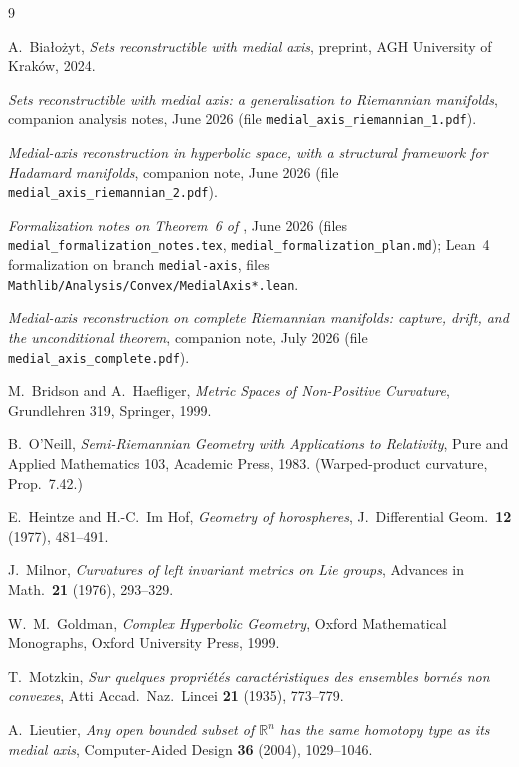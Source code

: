 \documentclass[11pt]{article}
\theoremstyle{remark}
\begin{document}
\begin{thebibliography}{9}

 A.~Bia\l{}o\.zyt, \emph{Sets reconstructible with medial
axis}, preprint, AGH University of Krak\'ow, 2024.

 \emph{Sets reconstructible with medial axis: a
generalisation to Riemannian manifolds}, companion analysis notes,
June 2026 (file \texttt{medial\_axis\_riemannian\_1.pdf}).

 \emph{Medial-axis reconstruction in hyperbolic space,
with a structural framework for Hadamard manifolds}, companion note,
June 2026 (file \texttt{medial\_axis\_riemannian\_2.pdf}).

 \emph{Formalization notes on Theorem~6 of
\cite{Bia}}, June 2026 (files
\texttt{medial\_formalization\_notes.tex},
\texttt{medial\_formalization\_plan.md}); Lean~4 formalization on
branch \texttt{medial-axis}, files
\texttt{Mathlib/Analysis/Convex/MedialAxis*.lean}.

 \emph{Medial-axis reconstruction on complete Riemannian
manifolds: capture, drift, and the unconditional theorem}, companion
note, July 2026 (file \texttt{medial\_axis\_complete.pdf}).

 M.~Bridson and A.~Haefliger, \emph{Metric Spaces of
Non-Positive Curvature}, Grundlehren 319, Springer, 1999.

 B.~O'Neill, \emph{Semi-Riemannian Geometry with
Applications to Relativity}, Pure and Applied Mathematics 103,
Academic Press, 1983. (Warped-product curvature, Prop.~7.42.)

 E.~Heintze and H.-C.~Im Hof, \emph{Geometry of
horospheres}, J.\ Differential Geom.\ \textbf{12} (1977), 481--491.

 J.~Milnor, \emph{Curvatures of left invariant metrics on
Lie groups}, Advances in Math.\ \textbf{21} (1976), 293--329.

 W.~M.~Goldman, \emph{Complex Hyperbolic Geometry}, Oxford
Mathematical Monographs, Oxford University Press, 1999.

 T.~Motzkin, \emph{Sur quelques propri\'et\'es
caract\'eristiques des ensembles born\'es non convexes}, Atti Accad.\
Naz.\ Lincei \textbf{21} (1935), 773--779.

 A.~Lieutier, \emph{Any open bounded subset of
$\mathbb{R}^{n}$ has the same homotopy type as its medial axis},
Computer-Aided Design \textbf{36} (2004), 1029--1046.

\end{thebibliography}
\end{document}
